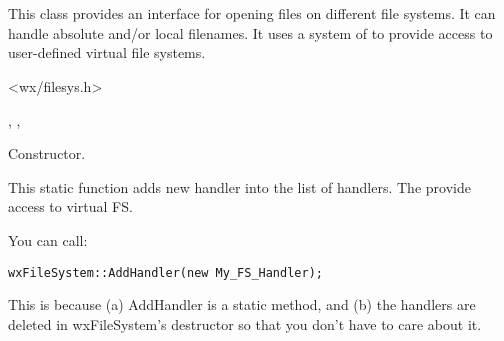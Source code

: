 %
%

\section{}\label{wxfilesystem}

This class provides an interface for opening files on different
file systems. It can handle absolute and/or local filenames.
It uses a system of  to
provide access to user-defined virtual file systems.




<wx/filesys.h>


, 
, 


\label{wxfilesystemwxfilesystem}


Constructor. 

\label{wxfilesystemaddhandler}


This static function adds new handler into the list of handlers.
The  provide access to virtual FS.


You can call:

\begin{verbatim}
wxFileSystem::AddHandler(new My_FS_Handler);
\end{verbatim}

This is because (a) AddHandler is a static method, and (b) the handlers
are deleted in wxFileSystem's destructor so that you don't have to
care about it.

\label{wxfilesystemchangepathto}


